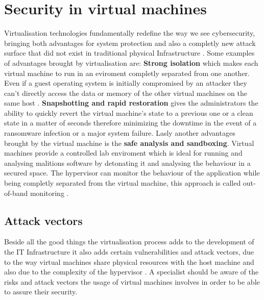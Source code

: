 \section{Security in virtual machines}
Virtualisation technologies fundamentally redefine the way we see cybersecurity, bringing both advantages for system protection and also a completly new attack surface that did not exist in traditional physical Infrastructure \cite{vm-security.pdf,vm-attack-vectors}. Some examples of advantages brought by virtualisation are: \textbf{Strong isolation} which makes each virtual machine to run in an eviroment completly separated from one another. Even if a guest operating system is initially compromised by an attacker they can't directly access the data or memory of the other virtual machines on the same host \cite{vm-security.pdf}. \textbf{Snapshotting and rapid restoration} gives the administrators the ability to quickly revert the virtual machine's state to a previous one or a clean state in a matter of seconds therefore minimizing the downtime in the event of a ransomware infection or a major system failure. Lasly another advantages brought by the virtual machine is the \textbf{safe analysis and sandboxing}. Virtual machines provide a controlled lab enviroment which is ideal for running and analysing malitions software by detonating it and analysing the behaviour in a secured space. The hypervisor can monitor the behaviour of the application while being completly separated from the virtual machine, this approach is called out-of-band monitoring \cite{vm-security.pdf}. 

\subsection{Attack vectors}
Beside all the good things the virtualisation process adds to the development of the IT Infrastructure it also adds certain vulnerabilities and attack vectors, due to the way virtual machines share physical resources with the host machine and also due to the complexity of the hypervisor \cite{vm-security.pdf}. A specialist should be aware of the risks and attack vectors the usage of virtual machines involves in order to be able to assure their security.

